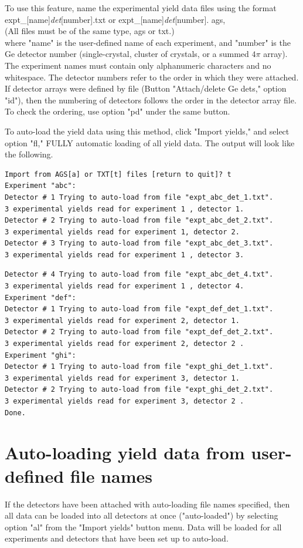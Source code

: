 \documentclass[10pt]{article}
\begin{document}
To use this feature, name the experimental yield data files using the format\\[0pt]
expt\_[name]\textit{det}[number].txt or expt\_[name]\textit{det}[number]. ags,\\
(All files must be of the same type, ags or txt.)\\
where "name" is the user-defined name of each experiment, and "number" is the Ge detector number (single-crystal, cluster of crystals, or a summed $4 \pi$ array). The experiment names must contain only alphanumeric characters and no whitespace. The detector numbers refer to the order in which they were attached. If detector arrays were defined by file (Button "Attach/delete Ge dets," option "id"), then the numbering of detectors follows the order in the detector array file. To check the ordering, use option "pd" under the same button.

To auto-load the yield data using this method, click "Import yields," and select option "fl," FULLY automatic loading of all yield data. The output will look like the following.

\begin{verbatim}
Import from AGS[a] or TXT[t] files [return to quit]? t
Experiment "abc":
Detector # 1 Trying to auto-load from file "expt_abc_det_1.txt".
3 experimental yields read for experiment 1 , detector 1.
Detector # 2 Trying to auto-load from file "expt_abc_det_2.txt".
3 experimental yields read for experiment 1, detector 2.
Detector # 3 Trying to auto-load from file "expt_abc_det_3.txt".
3 experimental yields read for experiment 1 , detector 3.
\end{verbatim}

\begin{verbatim}
Detector # 4 Trying to auto-load from file "expt_abc_det_4.txt".
3 experimental yields read for experiment 1 , detector 4.
Experiment "def":
Detector # 1 Trying to auto-load from file "expt_def_det_1.txt".
3 experimental yields read for experiment 2, detector 1.
Detector # 2 Trying to auto-load from file "expt_def_det_2.txt".
3 experimental yields read for experiment 2, detector 2 .
Experiment "ghi":
Detector # 1 Trying to auto-load from file "expt_ghi_det_1.txt".
3 experimental yields read for experiment 3, detector 1.
Detector # 2 Trying to auto-load from file "expt_ghi_det_2.txt".
3 experimental yields read for experiment 3, detector 2 .
Done.
\end{verbatim}

\section*{Auto-loading yield data from user-defined file names}
If the detectors have been attached with auto-loading file names specified, then all data can be loaded into all detectors at once ("auto-loaded") by selecting option "al" from the "Import yields" button menu. Data will be loaded for all experiments and detectors that have been set up to auto-load.
\end{document}
